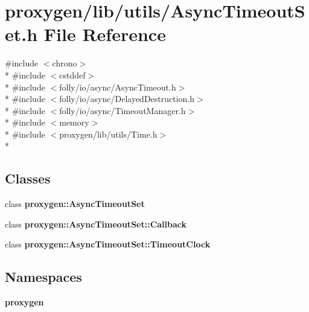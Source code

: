 \section{proxygen/lib/utils/\+Async\+Timeout\+Set.h File Reference}
\label{AsyncTimeoutSet_8h}
{\ttfamily \#include $<$chrono$>$}\\*
{\ttfamily \#include $<$cstddef$>$}\\*
{\ttfamily \#include $<$folly/io/async/\+Async\+Timeout.\+h$>$}\\*
{\ttfamily \#include $<$folly/io/async/\+Delayed\+Destruction.\+h$>$}\\*
{\ttfamily \#include $<$folly/io/async/\+Timeout\+Manager.\+h$>$}\\*
{\ttfamily \#include $<$memory$>$}\\*
{\ttfamily \#include $<$proxygen/lib/utils/\+Time.\+h$>$}\\*
\subsection*{Classes}
\begin{DoxyCompactItemize}
\item 
class {\bf proxygen\+::\+Async\+Timeout\+Set}
\item 
class {\bf proxygen\+::\+Async\+Timeout\+Set\+::\+Callback}
\item 
class {\bf proxygen\+::\+Async\+Timeout\+Set\+::\+Timeout\+Clock}
\end{DoxyCompactItemize}
\subsection*{Namespaces}
\begin{DoxyCompactItemize}
\item 
 {\bf proxygen}
\end{DoxyCompactItemize}
